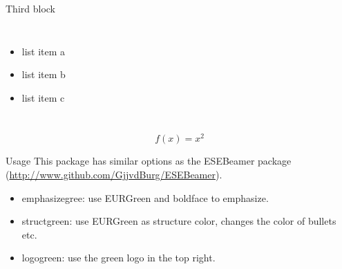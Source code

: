 \documentclass{beamer}
\begin{document}
\begin{frame}
\begin{columns}[t]
\begin{column}{.3\paperwidth}
\begin{block}{Third block}
\begin{columns}
				\begin{itemize}
					\item list item a
					\item list item b
					\item list item c
				\end{itemize}
			\end{columns}
			\baselineskip
			\begin{equation*}
				f(x) = x^2
			\end{equation*}
		\end{block}
		\vfill
		\begin{block}{Usage}
			This package has similar options as the ESEBeamer package (\url{http://www.github.com/GjjvdBurg/ESEBeamer}).
			\begin{itemize}
				\item emphasizegree: use {\color{EURGreen} EURGreen} and boldface to emphasize.
				\item structgreen: use {\color{EURGreen} EURGreen} as structure color, changes the color of bullets etc.
				\item logogreen: use the green logo in the top right.
			\end{itemize}
		\end{block}
    \end{column}
	

\end{columns}
\end{frame}
\end{document}
